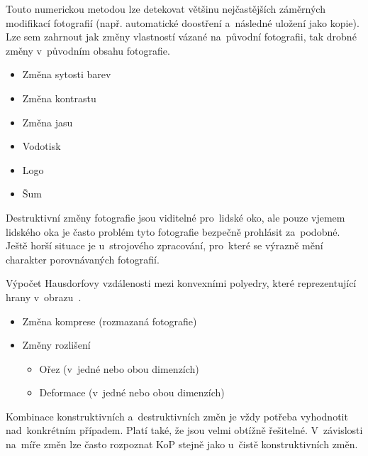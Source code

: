 Touto numerickou metodou lze detekovat většinu nejčastějších záměrných modifikací fotografií (např. automatické doostření a~následné uložení jako kopie). Lze sem zahrnout jak změny vlastností vázané na~původní fotografii, tak drobné změny v~původním obsahu fotografie.

\begin{itemize}
	\setlength{\parskip}{0pt}
	\setlength{\itemsep}{0pt}
	\item{Změna sytosti barev}
	\item{Změna kontrastu}
	\item{Změna jasu}
\end{itemize}

\begin{itemize}
	\setlength{\parskip}{0pt}
	\setlength{\itemsep}{0pt}
	\item{Vodotisk}
	\item{Logo}
	\item{Šum}
\end{itemize}

Destruktivní změny fotografie jsou viditelné pro~lidské oko, ale pouze vjemem lidského oka je často problém tyto fotografie bezpečně prohlásit za~podobné. Ještě horší situace je u~strojového zpracování, pro~které se výrazně mění charakter porovnávaných fotografií.

Výpočet Hausdorfovy vzdálenosti mezi konvexními polyedry, které reprezentující hrany v~obrazu~\cite{FFT-technique}.

\begin{itemize}
	\setlength{\parskip}{0pt}
	\setlength{\itemsep}{0pt}
	\item{Změna komprese (rozmazaná fotografie)}
	\item{Změny rozlišení}
	\begin{itemize}
		\item{Ořez (v~jedné nebo obou dimenzích)}
		\item{Deformace (v~jedné nebo obou dimenzích)}
	\end{itemize}
\end{itemize}

Kombinace konstruktivních a~destruktivních změn je vždy potřeba vyhodnotit nad~konkrétním případem. Platí také, že jsou velmi obtížně řešitelné. V~závislosti na~míře změn lze často rozpoznat KoP stejně jako u~čistě konstruktivních změn.

